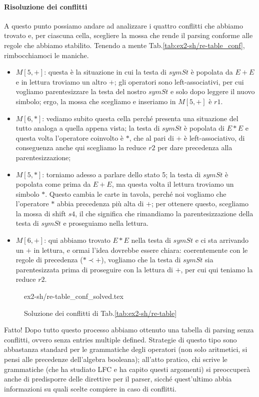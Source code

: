 \documentclass[class=book, crop=false, oneside, 12pt]{standalone}
\begin{document}
\paragraph{Risoluzione dei conflitti}
A questo punto possiamo andare ad analizzare i quattro conflitti che abbiamo trovato e, per ciascuna cella, scegliere la mossa che rende il parsing conforme alle regole che abbiamo stabilito. Tenendo a mente Tab.\ref{tab:ex2-sh/re-table_conf}, rimbocchiamoci le maniche.
\begin{itemize}
    \item \(M[5, +]\): questa è la situazione in cui la testa di \(symSt\) è popolata da \(E + E\) e in lettura troviamo un altro \(+\); gli operatori sono left-associativi, per cui vogliamo parentesizzare la testa del nostro \(symSt\) e solo dopo leggere il nuovo simbolo; ergo, la mossa che scegliamo e inseriamo in \(M[5, +]\) è \(r1\).
    \item \(M[6, *]\): vediamo subito questa cella perché presenta una situazione del tutto analoga a quella appena vista;  la testa di \(symSt\) è popolata di \(E * E\) e questa volta l'operatore coinvolto è \(\ast\), che al pari di \(+\) è left-associativo, di conseguenza anche qui scegliamo la reduce \(r2\) per dare precedenza alla parentesizzazione;
    \item \(M[5, *]\): torniamo adesso a parlare dello stato 5; la testa di \(symSt\) è popolata come prima da \(E + E\), ma questa volta il lettura troviamo un simbolo \(\ast\). Questo cambia le carte in tavola, perché noi vogliamo che l'operatore \(\ast\) abbia precedenza più alta di \(+\); per ottenere questo, scegliamo la mossa di shift \(s4\), il che significa che rimandiamo la parentesizzazione della testa di \(symSt\) e proseguiamo nella lettura.
    \item \(M[6, +]\): qui abbiamo trovato \(E * E\) nella testa di \(symSt\) e ci sta arrivando un \(+\) in lettura, e ormai l'idea dovrebbe essere chiara: coerentemente con le regole di precedenza (\(\ast \prec +\)), vogliamo che la testa di \(symSt\) sia parentesizzata prima di proseguire con la lettura di \(+\), per cui qui teniamo la reduce \(r2\).
\end{itemize}

\begin{figure}[H]
    \centering
    {ex2-sh/re-table_conf_solved.tex}
    \caption{Soluzione dei conflitti di Tab.\ref{tab:ex2-sh/re-table}}
    \label{tab:ex2-sh/re-table_conf_solved}
\end{figure}
Fatto! Dopo tutto questo processo abbiamo ottenuto una tabella di parsing senza conflitti, ovvero senza entries multiple defined. Strategie di questo tipo sono abbastanza standard per le grammatiche degli operatori (non solo aritmetici, si pensi alle precedenze dell'algebra booleana); all'atto pratico, chi scrive le grammatiche (che ha studiato LFC e ha capito questi argomenti) si preoccuperà anche di predisporre delle direttive per il parser, sicché quest'ultimo abbia informazioni su quali scelte compiere in caso di conflitti.
\end{document}
